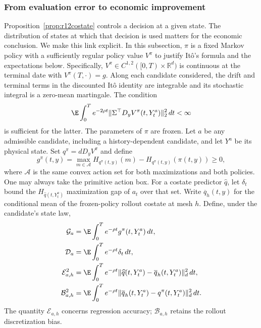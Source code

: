 \subsubsection{From evaluation error to economic improvement}
\label{sec:r14costate}
Proposition~\ref{prop:r12costate} controls a decision at a given state.
The distribution of states at which that decision is used matters for
the economic conclusion. We make this link explicit. In this subsection,
$\pi$ is a fixed Markov policy with a sufficiently regular policy value
$V^\pi$ to justify It\^o's formula and the expectations below. Specifically, $V^\pi\in C^{1,2}([0,T)\times\mathbb R^d)$ is continuous at the terminal date with $V^\pi(T,\cdot)=g$. Along each candidate considered, the drift and terminal terms in the discounted It\^o identity are integrable and its stochastic integral is a zero-mean martingale. The condition
\[
 \E\int_0^T e^{-2\rho t}
 \|\Sigma^\top D_yV^\pi(t,Y_t^a)\|_2^2\,dt<\infty
\]
is sufficient for the latter. The parameters of $\pi$ are frozen. Let $a$ be any admissible candidate, including
a history-dependent candidate, and let $Y^a$ be its physical state.
Set $q^\pi=dD_yV^\pi$ and define
\[
 g^\pi(t,y)=\max_{m\in\mathcal A}H_{q^\pi(t,y)}(m)
                 -H_{q^\pi(t,y)}(\pi(t,y))\geq0,
\]
where $\mathcal A$ is the same convex action set for both maximizations
and both policies. One may always take the primitive action box.
For a costate predictor $\widehat q$, let $\delta_t$ bound the
$H_{\widehat q(t,Y_t^a)}$ maximization gap of $a_t$ over that set.
Write $\overline q_h(t,y)$ for the conditional mean of the frozen-policy
rollout costate at mesh $h$. Define, under the candidate's state law,
\begin{align*}
 \mathcal G_a&=\E\int_0^T e^{-\rho t}g^\pi(t,Y_t^a)\,dt,\\
 \mathcal D_a&=\E\int_0^T e^{-\rho t}\delta_t\,dt,\\
 \mathcal E_{a,h}^2&=\E\int_0^T e^{-\rho t}
      \|\widehat q(t,Y_t^a)-\overline q_h(t,Y_t^a)\|_d^2\,dt,\\
 \mathcal B_{a,h}^2&=\E\int_0^T e^{-\rho t}
      \|\overline q_h(t,Y_t^a)-q^\pi(t,Y_t^a)\|_d^2\,dt.
\end{align*}
The quantity $\mathcal E_{a,h}$ concerns regression accuracy;
$\mathcal B_{a,h}$ retains the rollout discretization bias.

